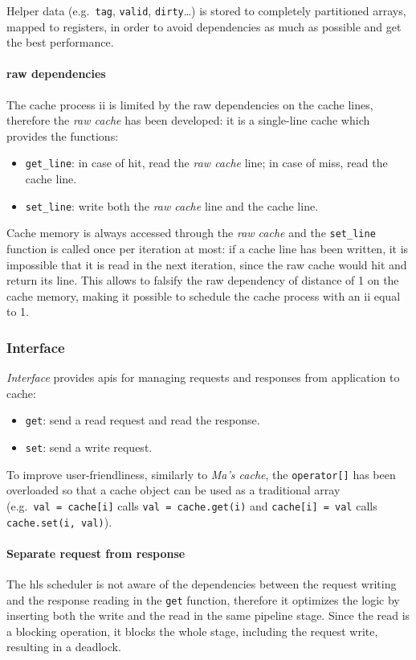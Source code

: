 \documentclass[11pt,a4paper,oneside]{memoir}
\begin{document}
Helper data (e.g.\ \texttt{tag}, \texttt{valid}, \texttt{dirty}\ldots) is stored
to completely partitioned arrays, mapped to registers, in order to avoid
dependencies as much as possible and get the best performance.

\paragraph{\acl{raw} dependencies}
The cache process \ac{ii} is limited by the \ac{raw} dependencies on the cache
lines, therefore the \emph{\ac{raw} cache} has been developed: it is a
single-line cache which provides the functions:
\begin{itemize}
	\item \texttt{get\_line}: in case of hit, read the \emph{\ac{raw}
		cache} line; in case of miss, read the cache line.
	\item \texttt{set\_line}: write both the \emph{\ac{raw} cache} line and
		the cache line.
\end{itemize}

Cache memory is always accessed through the \emph{\ac{raw} cache} and the
\texttt{set\_line} function is called once per iteration at most: if a cache
line has been written, it is impossible that it is read in the next iteration,
since the \ac{raw} cache would hit and return its line. This allows to falsify
the \ac{raw} dependency of distance of 1 on the cache memory, making it
possible to schedule the cache process with an \ac{ii} equal to 1.

\subsubsection{Interface}
\emph{Interface} provides \acsp{api} for managing requests and responses from
application to cache:
\begin{itemize}
	\item \texttt{get}: send a read request and read the response.
	\item \texttt{set}: send a write request.
\end{itemize}
To improve user-friendliness, similarly to \emph{Ma's cache}, the
\texttt{operator[]} has been overloaded so that a cache object can be used as a
traditional array (e.g.\ \texttt{val~=~cache[i]} calls
\texttt{val~=~cache.get(i)} and \texttt{cache[i]~=~val} calls
\texttt{cache.set(i,~val)}).

\paragraph{Separate request from response}
The \ac{hls} scheduler is not aware of the dependencies between the request
writing and the response reading in the \texttt{get} function, therefore it
optimizes the logic by inserting both the write and the read in the same
pipeline stage. Since the read is a blocking operation, it blocks the whole
stage, including the request write, resulting in a deadlock.
\end{document}
